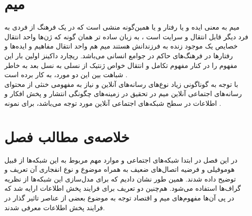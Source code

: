 \section{میم}
\begin {persian}
\noindent
میم به معنی ایده و‌ یا رفتار و‌ یا همین‌گونه منشی است که در‌ یک فرهنگ از فردی به فرد دیگر قابل انتقال و سرایت است \cite{blackmore_meme_2000}، به زبان ساده تر همان گونه که ژن‌ها واحد انتقال خصایص ‌یک موجود زنده به فرزندانش هستند میم هم واحد انتقال مفاهیم و ایده‌‌ها و رفتارها در فرهنگ‌های حاکم در جوامع انسانی می‌باشد. ریچارد داکینز اولین بار این مفهوم را در کنار مفهوم تکامل و انتقال خواص ژنتیک از نسلی به نسل بعد به خاطر شباهت بین این دو مورد، به کار برده است \cite{dawkins_selfish_1976}. 
\\
\indent
با توجه به گوناگونی زیاد نوع‌های رسانه‌های آنلاین و نیاز‌ به مفهومی‌ خنثی از محتوای رسانه‌های اجتماعی آنلاین میم در تحقیق در زمینه‌های چگونگی انتشار و پخش افکار و اطلاعات در سطح شبکه‌های اجتماعی آنلاین مورد توجه می‌باشد، برای نمونه 
. 


\end{persian}


\section{خلاصه‌ی مطالب فصل}
\noindent 
در این فصل در ابتدا شبکه‌‌های اجتماعی و موارد مهم مربوط به این شبکه‌ها از قبیل هوموفیلی و فرضیه اتصال‌های ضعیف به همراه موضوع و نوع انفجاری آن تعریف و توضیح داده شدند. همین طور نشان دادیم که برای مدل‌سازی این شبکه‌ها از نظریه گراف‌ها استفاده می‌شود. هم‌چنین دو تعریف برای فرایند پخش اطلاعات ارایه شد که در پی آن‌ها مفهوم‌های میم و اقتصاد توجه به موضوع بعضی از عناصر تاثیر گذار در فرایند پخش اطلاعات معرفی شدند. 